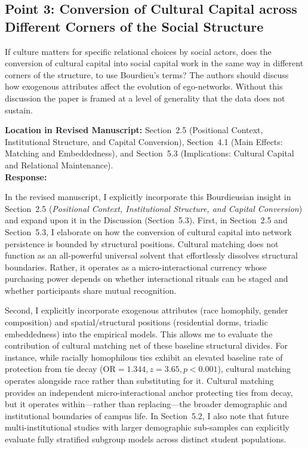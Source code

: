 \documentclass[11pt]{article}
\begin{document}
\subsection*{Point 3: Conversion of Cultural Capital across Different Corners of the Social Structure}

\begin{reviewercomment}
If culture matters for specific relational choices by social actors, does the conversion of cultural capital into social capital work in the same way in different corners of the structure, to use Bourdieu's terms? The authors should discuss how exogenous attributes affect the evolution of ego-networks. Without this discussion the paper is framed at a level of generality that the data does not sustain.
\end{reviewercomment}

\noindent\textbf{Location in Revised Manuscript:} Section~2.5 (Positional Context, Institutional Structure, and Capital Conversion), Section~4.1 (Main Effects: Matching and Embeddedness), and Section~5.3 (Implications: Cultural Capital and Relational Maintenance).\\[4pt]
\textbf{Response:} 

In the revised manuscript, I explicitly incorporate this Bourdieusian insight in Section~2.5 (\textit{Positional Context, Institutional Structure, and Capital Conversion}) and expand upon it in the Discussion (Section~5.3). First, in Section~2.5 and Section~5.3, I elaborate on how the conversion of cultural capital into network persistence is bounded by structural positions. Cultural matching does not function as an all-powerful universal solvent that effortlessly dissolves structural boundaries. Rather, it operates as a micro-interactional currency whose purchasing power depends on whether interactional rituals can be staged and whether participants share mutual recognition.

Second, I explicitly incorporate exogenous attributes (race homophily, gender composition) and spatial/structural positions (residential dorms, triadic embeddedness) into the empirical models. This allows me to evaluate the contribution of cultural matching net of these baseline structural divides. For instance, while racially homophilous ties exhibit an elevated baseline rate of protection from tie decay ($\text{OR} = 1.344, z = 3.65, p < 0.001$), cultural matching operates alongside race rather than substituting for it. Cultural matching provides an independent micro-interactional anchor protecting ties from decay, but it operates within—rather than replacing—the broader demographic and institutional boundaries of campus life. In Section~5.2, I also note that future multi-institutional studies with larger demographic sub-samples can explicitly evaluate fully stratified subgroup models across distinct student populations.
\end{document}
